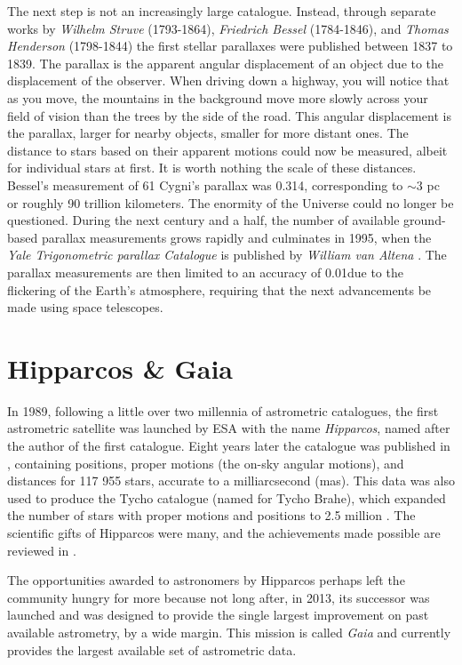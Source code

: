 The next step is not an increasingly large catalogue. Instead, through separate works by \textit{Wilhelm Struve} (1793-1864), \textit{Friedrich Bessel} (1784-1846), and \textit{Thomas Henderson} (1798-1844) the first stellar parallaxes were published between 1837 to 1839. The parallax is the apparent angular displacement of an object due to the displacement of the observer. When driving down a highway, you will notice that as you move, the mountains in the background move more slowly across your field of vision than the trees by the side of the road. This angular displacement is the parallax, larger for nearby objects, smaller for more distant ones. The distance to stars based on their apparent motions could now be measured, albeit for individual stars at first. It is worth nothing the scale of these distances. Bessel's measurement of 61 Cygni's parallax was 0.314\as, corresponding to ${\sim}3$ pc or roughly 90 trillion kilometers. The enormity of the Universe could no longer be questioned. During the next century and a half, the number of available ground-based parallax measurements grows rapidly and culminates in 1995, when the \textit{Yale Trigonometric parallax Catalogue} is published by \textit{William van Altena} \citep{vanaltena:95}. The parallax measurements are then limited to an accuracy of 0.01\as due to the flickering of the Earth's atmosphere, requiring that the next advancements be made using space telescopes.

\section{Hipparcos \& Gaia}\label{sec:gaia}
In 1989, following a little over two millennia of astrometric catalogues, the first astrometric satellite was launched by ESA with the name \textit{Hipparcos}, named after the author of the first catalogue. Eight years later the catalogue was published in \cite{perryman:97}, containing positions, proper motions (the on-sky angular motions), and distances for 117 955 stars, accurate to a milliarcsecond (mas). This data was also used to produce the Tycho catalogue (named for Tycho Brahe), which expanded the number of stars with proper motions and positions to 2.5 million \citep{hog:00}. The scientific gifts of Hipparcos were many, and the achievements made possible are reviewed in \cite{perryman:09}. 

The opportunities awarded to astronomers by Hipparcos perhaps left the community hungry for more because not long after, in 2013, its successor was launched and was designed to provide the single largest improvement on past available astrometry, by a wide margin. This mission is called \textit{Gaia} \citep{gaia} and currently provides the largest available set of astrometric data. 

